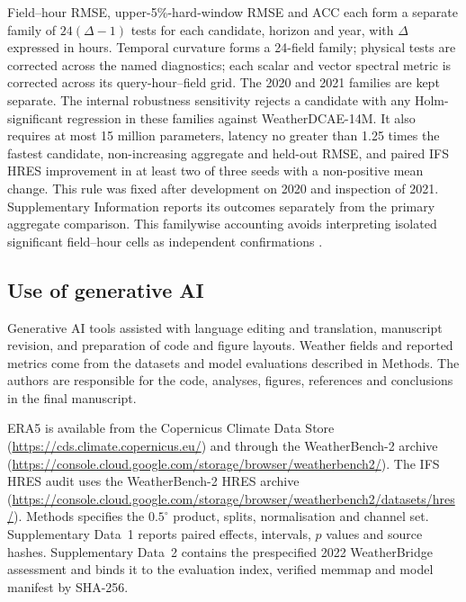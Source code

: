 \documentclass[referee,lineno,pdflatex,sn-nature]{sn-jnl}
\begin{document}
Field--hour RMSE, upper-5\%-hard-window RMSE and ACC each form a separate
family of $24(\Delta-1)$ tests for each candidate, horizon and year, with
$\Delta$ expressed in hours. Temporal curvature forms a 24-field family;
physical tests are corrected across the named diagnostics; each scalar and
vector spectral metric is corrected across its query-hour--field grid.
The 2020 and 2021 families are kept separate.
The internal robustness sensitivity rejects a candidate with any
Holm-significant regression in these families against WeatherDCAE-14M.
It also requires at most 15 million parameters, latency no greater than
1.25 times the fastest candidate, non-increasing aggregate and held-out
RMSE, and paired IFS HRES improvement in at least two of three seeds with
a non-positive mean change. This rule was fixed after development on 2020
and inspection of 2021. Supplementary Information reports its outcomes
separately from the primary aggregate comparison.
This familywise accounting avoids interpreting isolated significant
field--hour cells as independent confirmations \cite{wilks2016stippled}.

\subsection{Use of generative AI}

Generative AI tools assisted with language editing and translation,
manuscript revision, and preparation of code and figure layouts. Weather
fields and reported metrics come from the datasets and model evaluations
described in Methods. The authors are responsible for the code, analyses,
figures, references and conclusions in the final manuscript.

\backmatter


ERA5 is available from the Copernicus Climate Data Store
(\url{https://cds.climate.copernicus.eu/}) and through the
WeatherBench-2 archive
(\url{https://console.cloud.google.com/storage/browser/weatherbench2/}).
The IFS HRES audit uses the WeatherBench-2 HRES archive
(\url{https://console.cloud.google.com/storage/browser/weatherbench2/datasets/hres/}).
Methods specifies the $0.5^\circ$ product, splits, normalisation and channel
set. Supplementary Data~1 reports paired effects, intervals, $p$ values and
source hashes. Supplementary Data~2 contains the prespecified 2022 WeatherBridge
assessment and binds it to the evaluation index, verified memmap and model
manifest by SHA-256.
\end{document}

